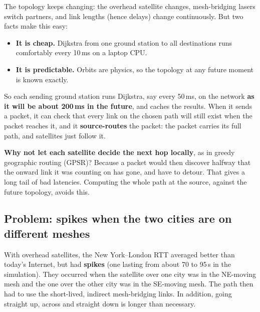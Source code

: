 The topology keeps changing: the overhead satellite changes, mesh-bridging lasers switch partners, and link lengths (hence delays) change continuously. But two
facts make this easy:
\begin{itemize}
  \item \textbf{It is cheap.} Dijkstra from one ground station to all destinations runs comfortably every 10\,ms on a laptop CPU.
  \item \textbf{It is predictable.} Orbits are physics, so the topology at any future moment is known exactly.
\end{itemize}
So each sending ground station runs Dijkstra, say every 50\,ms, on the network \textbf{as it will be about 200\,ms in the future}, and caches the results. When it sends a
packet, it can check that every link on the chosen path will still exist when the packet reaches it, and it \textbf{source-routes} the packet: the packet carries its
full path, and satellites just follow it.

\textbf{Why not let each satellite decide the next hop locally}, as in greedy geographic routing (GPSR)? Because a packet would then discover halfway that the onward
link it was counting on has gone, and have to detour. That gives a long tail of bad latencies. Computing the whole path at the source, against the future
topology, avoids this.

\subsection{Problem: spikes when the two cities are on different meshes}
With overhead satellites, the New York--London RTT averaged better than today's Internet, but had \textbf{spikes} (one lasting from about 70 to 95\,s in the
simulation). They occurred when the satellite over one city was in the NE-moving mesh and the one over the other city was in the SE-moving mesh. The path then had
to use the short-lived, indirect mesh-bridging links. In addition, going straight up, across and straight down is longer than necessary.

